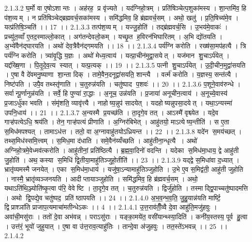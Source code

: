 2.1.3.2
घ॒र्मो वा ए॒षोऽशान्तः । अह॑रह॒ प्र वृ॑ज्यते । यद॑ग्निहो॒त्रम् । प्रति॑षिञ्चेत्प॒शुका॑मस्य । शा॒न्तमि॑व॒ हि प॑श॒व्यम् । न प्रति॑षिञ्चेद्ब्रह्मवर्च॒सका॑मस्य । समि॑द्धमिव॒ हि ब्र॑ह्मवर्च॒सम् । अथो॒ खलु॑ । प्र॒ति॒षिच्य॑मे॒व । यत्प्र॑तिषि॒ञ्चति॑ ।। 17 ।।
2.1.3.3
तत्प॑श॒व्यम् । यज्जु॒होति॑ । तद्ब्र॑ह्मवर्च॒सि । उ॒भय॑मे॒वाकः॑ । प्रच्यु॑त॒व्वाँ ए॒तद॒स्माल्लो॒कात् । अग॑तन्देवलो॒कम् । यच्छृ॒त ह॒विरन॑भिघारितम् । अ॒भि द्यो॑तयति । अ॒भ्ये॑वैन॑द्घारयति । अथो॑ देव॒त्रैवैन॑द्गमयति ।। 18 ।।
2.1.3.4
पर्य॑ग्नि करोति । रख्ष॑सा॒मप॑हत्यै । त्रि पर्य॑ग्नि करोति । त्र्या॑वृ॒द्धि य॒ज्ञः । अथो॑ मेध्य॒त्वाय॑ । यत्प्रा॒चीन॑मुद्वा॒सयेत् । यज॑मान शु॒चाऽर्प॑येत् । यद्द॑ख्षि॒णा । पि॒तृ॒दे॒व॒त्य॑ स्यात् । यत्प्र॒त्यक् ।। 19 ।।
2.1.3.5
पत्नी॑ शु॒चाऽर्प॑येत् । उ॒दी॒चीन॒मुद्वा॑सयति । ए॒षा वै दे॑वमनु॒ष्याणा॑ शा॒न्ता दिक् । तामे॒वैन॒दनूद्वा॑सयति॒ शान्त्यै । वर्त्म॑ करोति । य॒ज्ञस्य॒ सन्त॑त्यै । निष्ट॑पति । उपै॒व तथ्स्तृ॑णाति । च॒तुरुन्न॑यति । चतु॑ष्पाद प॒शवः॑ ।। 20 ।।
2.1.3.6
प॒शूने॒वाव॑रुन्धे । सर्वान्पू॒र्णानुन्न॑यति । सर्वे॒ हि पुण्या॑ रा॒द्धाः । अ॒नूच॒ उन्न॑यति । प्र॒जाया॑ अनूचीन॒त्वाय॑ । अ॒नूच्ये॒वास्य॑ प्र॒जाऽर्धु॑का भवति । संमृ॑शति॒ व्यावृ॑त्त्यै । नाहोष्य॒न्नुप॑ सादयेत् । यदहोष्यन्नुपसा॒दयेत् । यथा॒ऽन्यस्मा॑ उपनि॒धाय॑ ।। 21 ।।
2.1.3.7
अ॒न्यस्मै प्र॒यच्छ॑ति । ता॒दृगे॒व तत् । आऽस्मै॑ वृश्च्येत । यदे॒व गाऱ्ह॑पत्येऽधि॒ श्रय॑ति । तेन॒ गाऱ्ह॑पत्यं प्रीणाति । अ॒ग्निर॑बिभेत् । आहु॑तयो॒ माऽत्येष्य॒न्तीति॑ । स ए॒ता स॒मिध॑मपश्यत् । तामाऽध॑त्त । ततो॒ वा अ॒ग्नावाहु॑तयोऽध्रियन्त ।। 22 ।।
2.1.3.8
यदे॑न स॒मय॑च्छत् । तथ्स॒मिध॑स्समि॒त्त्वम् । स॒मिध॒मा द॑धाति । समे॒वैन॑य्यँच्छति । आहु॑तीना॒न्धृत्यै । अथो॑ अग्निहो॒त्रमे॒वेध्मव॑त्करोति । आहु॑तीनां॒ प्रति॑ष्ठित्यै । ब्र॒ह्म॒वा॒दिनो॑ वदन्ति । यदेका॑ स॒मिध॑मा॒धाय॒ द्वे आहु॑ती जु॒होति॑ । अथ॒ कस्या॑ स॒मिधि॑ द्वि॒तीया॒माहु॑तिञ्जुहो॒तीति॑ ।। 23 ।।
2.1.3.9
यद्द्वे स॒मिधा॑वा द॒ध्यात् । भ्रातृ॑व्यमस्मै जनयेत् । एका॑ स॒मिध॑मा॒धाय॑ । यजु॑षा॒ऽन्यामाहु॑तिञ्जुहोति । उ॒भे ए॒व स॒मिद्व॑ती॒ आहु॑ती जुहोति । नास्मै॒ भ्रातृ॑व्यञ्जनयति । आदीप्तायाञ्जुहोति । समि॑द्धमिव॒ हि ब्र॑ह्मवर्च॒सम् । अथो॒ यथाऽति॑थि॒ञ्ज्योति॑ष्कृ॒त्वा प॑रि॒ वेवेष्टि । ता॒दृगे॒व तत् । च॒तुरुन्न॑यति । द्विर्जु॑होति । तस्माद्द्वि॒पाच्चतु॑ष्पादमत्ति । अथो द्वि॒पद्ये॒व चतु॑ष्पद॒ प्रति॑ ष्ठापयति ।। 24 ।।
2.1.4.0
अ॒भ॒व॒न्भ॒व॒ति॒ जु॒हु॒यान्न॑यति मार्ष्टि॒ द्विप्राश्ञा॑ति प्राजाप॒त्यमाचा॑मतीन्धेऽकः ।। 4 ।।
2.1.4.1
उ॒त्त॒राव॑तीँ॒व्वै दे॒वा आहु॑ति॒मजु॑हवुः । अवा॑ची॒मसु॑राः । ततो॑ दे॒वा अभ॑वन्न् । पराऽसु॑राः । यङ्का॒मये॑त॒ वसी॑यान्थ्स्या॒दिति॑ । कनी॑य॒स्तस्य॒ पूर्व॑ हु॒त्वा । उत्त॑रं॒ भूयो॑ जुहुयात् । ए॒षा वा उ॑त्त॒राव॒त्याहु॑तिः । तान्दे॒वा अ॑जुहवुः । तत॒स्ते॑ऽभवन्न् ।। 25 ।।
2.1.4.2
